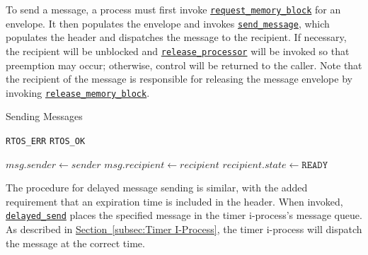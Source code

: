 \documentclass[12pt]{report}
\begin{document}
To send a message, a process must first invoke \hyperref[alg:requestingmemoryblocks]{\texttt{request_memory_block}} for an envelope. It then populates the envelope and invokes \hyperref[alg:sendingmessages]{\texttt{send_message}}, which populates the header and dispatches the message to the recipient. If necessary, the recipient will be unblocked and \hyperref[alg:releasingtheprocessor]{\texttt{release_processor}} will be invoked so that preemption may occur; otherwise, control will be returned to the caller. Note that the recipient of the message is responsible for releasing the message envelope by invoking \hyperref[alg:releasingmemoryblocks]{\texttt{release_memory_block}}.\\

\begin{algorithm}
\caption{Sending Messages}
\label{alg:sendingmessages}
\begin{algorithmic}[1]
        \State \Return \texttt{RTOS_ERR}
    \EndIf
            \State \Return {}
        \EndIf
    \EndIf
    \State \Return \texttt{RTOS_OK}
\EndProcedure

\Statex

    \State $msg.sender \leftarrow sender$
    \State $msg.recipient \leftarrow recipient$
    \State {}
        \State {}
        \State $recipient.state \leftarrow \texttt{READY}$
        \State {}
        \State {} 
    \Else
        \State {}
    \EndIf
\EndProcedure
\end{algorithmic}
\end{algorithm}

The procedure for delayed message sending is similar, with the added requirement that an expiration time is included in the header. When invoked, \hyperref[alg:sendingdelayedmessages]{\texttt{delayed_send}} places the specified message in the timer i-process's message queue. As described in \hyperref[subsec:Timer I-Process]{Section~\ref*{subsec:Timer I-Process}}, the timer i-process will dispatch the message at the correct time.\\
\end{document}
